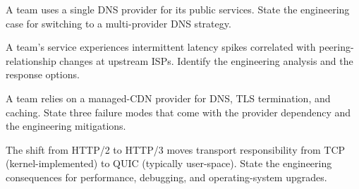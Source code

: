 \begin{exercise}
A team uses a single DNS provider for its public services. State the engineering case for switching to a multi-provider DNS strategy.
\end{exercise}

\begin{exercise}
A team's service experiences intermittent latency spikes correlated with peering-relationship changes at upstream ISPs. Identify the engineering analysis and the response options.
\end{exercise}

\begin{exercise}
A team relies on a managed-CDN provider for DNS, TLS termination, and caching. State three failure modes that come with the provider dependency and the engineering mitigations.
\end{exercise}

\begin{exercise}
The shift from HTTP/2 to HTTP/3 moves transport responsibility from TCP (kernel-implemented) to QUIC (typically user-space). State the engineering consequences for performance, debugging, and operating-system upgrades.
\end{exercise}
